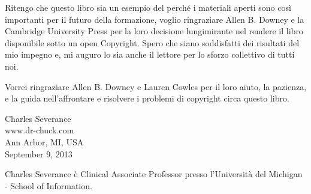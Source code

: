 Ritengo che questo libro sia un esempio del perch\'{e} i materiali aperti sono cos\`{i} importanti per il futuro della formazione, voglio ringraziare Allen B. Downey e la Cambridge University Press per la loro decisione lungimirante nel rendere il libro disponibile sotto un open Copyright. Spero che siano soddisfatti dei risultati del mio impegno e, mi auguro lo sia anche il lettore per lo sforzo collettivo di tutti noi.


Vorrei ringraziare Allen B. Downey e Lauren Cowles per il loro aiuto, la pazienza, e la guida nell'affrontare e risolvere i problemi di copyright circa questo libro.


\small{
Charles Severance\\
www.dr-chuck.com\\
Ann Arbor, MI, USA\\
September 9, 2013}

Charles Severance \`{e} Clinical Associate Professor presso l'Universit\`{a} del Michigan - School of Information.

\clearemptydoublepage

\begin{latexonly}

\tableofcontents

\clearemptydoublepage

\end{latexonly}

\mainmatter

